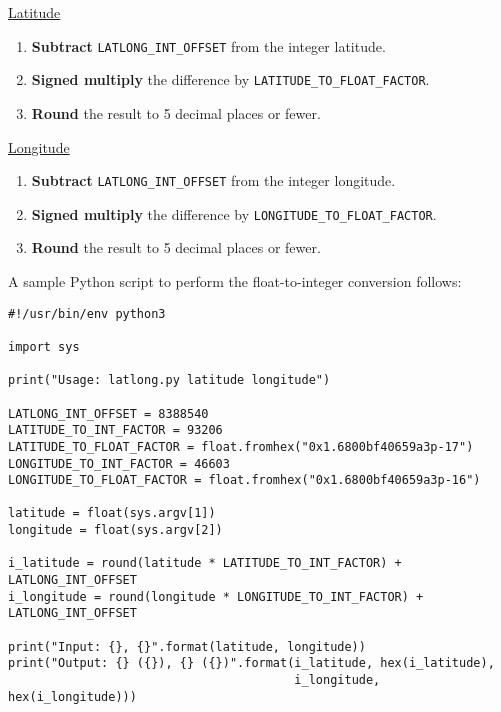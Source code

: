 \documentclass[12pt, oneside]{article}
\begin{document}
\begin{minipage}{0.5\textwidth}
\begin{center} \underline{Latitude}\end{center}
\begin{enumerate}
\item \textbf{Subtract} \texttt{LATLONG_INT_OFFSET} from the integer latitude. 
\item \textbf{Signed multiply} the difference by \texttt{LATITUDE_TO_FLOAT_FACTOR}. 
\item \textbf{Round} the result to 5 decimal places or fewer.
\end{enumerate}
\end{minipage}%
\begin{minipage}{0.5\textwidth}
\begin{center} \underline{Longitude}\end{center}
\begin{enumerate}
\item \textbf{Subtract} \texttt{LATLONG_INT_OFFSET} from the integer longitude. 
\item \textbf{Signed multiply} the difference by \texttt{LONGITUDE_TO_FLOAT_FACTOR}. 
\item \textbf{Round} the result to 5 decimal places or fewer.
\end{enumerate}
\end{minipage}

A sample Python script to perform the float-to-integer conversion follows:

\begin{verbatim}
#!/usr/bin/env python3

import sys

print("Usage: latlong.py latitude longitude")

LATLONG_INT_OFFSET = 8388540
LATITUDE_TO_INT_FACTOR = 93206
LATITUDE_TO_FLOAT_FACTOR = float.fromhex("0x1.6800bf40659a3p-17")
LONGITUDE_TO_INT_FACTOR = 46603
LONGITUDE_TO_FLOAT_FACTOR = float.fromhex("0x1.6800bf40659a3p-16")

latitude = float(sys.argv[1])
longitude = float(sys.argv[2])

i_latitude = round(latitude * LATITUDE_TO_INT_FACTOR) + LATLONG_INT_OFFSET
i_longitude = round(longitude * LONGITUDE_TO_INT_FACTOR) + LATLONG_INT_OFFSET

print("Input: {}, {}".format(latitude, longitude))
print("Output: {} ({}), {} ({})".format(i_latitude, hex(i_latitude), 
                                        i_longitude, hex(i_longitude)))
\end{verbatim}
\end{document}
